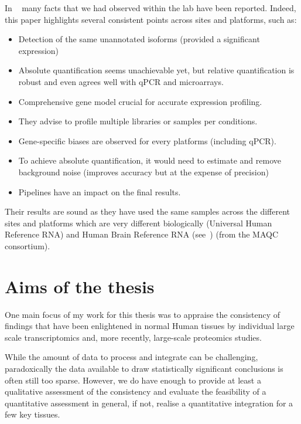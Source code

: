 In ~ many facts that
we had observed within the lab have been reported.
Indeed, this paper highlights several consistent points
across sites and platforms,
such as:
\begin{itemize}[topsep=0pt,nolistsep,noitemsep]
        \setlength{\itemsep}{1pt}
        \setlength{\parskip}{0pt}
        \setlength{\parsep}{0pt}
    \item Detection of the same unannotated isoforms (provided a significant expression)
    \item Absolute quantification seems unachievable yet,
        but relative quantification is robust and even agrees well with \gls{qPCR}
        and microarrays.
    \item Comprehensive gene model crucial for accurate expression profiling.
    \item They advise to profile multiple libraries or samples per conditions.
    \item Gene-specific biases are observed for every platforms
        (including \gls{qPCR}).
    \item To achieve absolute quantification, it would need to estimate and
        remove background noise (improves accuracy but at the expense of precision)
    \item Pipelines have an impact on the final results.
\end{itemize}

Their results are sound as they have used the same samples across the different
sites and platforms which are very different biologically (Universal
Human Reference RNA) and Human Brain Reference RNA
(see~) (from the \gls{MAQC} consortium).

\section*{Aims of the thesis}

One main focus of my work for this thesis was to appraise the
consistency of findings that have been enlightened in normal Human tissues by
individual large scale transcriptomics and, more recently, large-scale
proteomics studies.

While the amount of data to process and integrate can be challenging,
paradoxically the data available to draw statistically significant conclusions
is often still too sparse. However, we do have enough to provide at least a
qualitative assessment of the consistency and evaluate the feasibility of a
quantitative assessment in general, if not, realise a quantitative integration
for a few key tissues.

